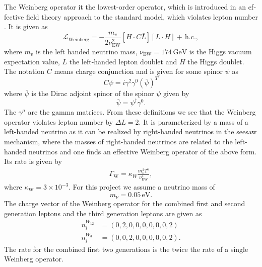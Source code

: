 \documentclass[master,       %
               twoside,        %
               BCOR10mm,       %
               english,ngerman, %
               ]{GAUBM}
\begin{document}
\begin{otherlanguage}{english}
The Weinberg operator it the lowest-order operator, which is introduced in an effective field theory approach to the standard model, which violates lepton number \cite[sec. 5]{Domcke:2020kcp_Generic_Couplings}.
It is given as
\begin{equation}
	\mathcal{L}_\mathrm{Weinberg} = - \frac{m_v}{2 \nu_\mathrm{EW}^2} [H \cdot C \bar{L}] [L \cdot H]+ \, \mathrm{h.c.},
\end{equation}
where $m_v$ is the left handed neutrino mass, $\nu_\mathrm{EW} = 174 \, \mathrm{GeV}$ is the Higgs vacuum expectation value,
$L$ the left-handed lepton doublet and $H$ the Higgs doublet.
The notation $C$ means charge conjunction and is given for some spinor $\psi$ as
\begin{equation}
	C \psi = i \gamma^2 \gamma^0 (\bar{\psi})^T
\end{equation}
where $\bar{\psi}$ is the Dirac adjoint spinor of the spinor $\psi$ given by
\begin{equation}
	\bar{\psi} = \psi^\dagger \gamma^0.
\end{equation}
The $\gamma^\mu$ are the gamma matrices.
From these definitions we see that the Weinberg operator violates lepton number by $\Delta L = 2$.
It is parameterized by a mass of a left-handed neutrino as it can be realized by right-handed neutrinos in the seesaw mechanism, where the masses of right-handed neutrinos are related to the left-handed neutrinos and one finds an effective Weinberg operator of the above form.
Its rate is given by
\begin{align}
	\Gamma_\mathrm{W} = \kappa_W\frac{m_\nu^2 T^6}{\nu_\mathrm{EW}^4},
\end{align}
where $\kappa_\mathrm{W} = 3 \times 10^{-3}$.
For this project we assume a neutrino mass of
\begin{equation}
	m_\nu = 0.05 \, \mathrm{eV}.
\end{equation}
The charge vector of the Weinberg operator for the combined first and second generation leptons and the third generation leptons are given as
\begin{align}
	n^{W_{12}}_i &= (0,2,0,0,0,0,0,0,2) \nonumber \\
	n^{W_{3}}_i &= (0,0,2,0,0,0,0,0,2).
\end{align}
The rate for the combined first two generations is the twice the rate of a single Weinberg operator.


\end{otherlanguage}
\end{document}
